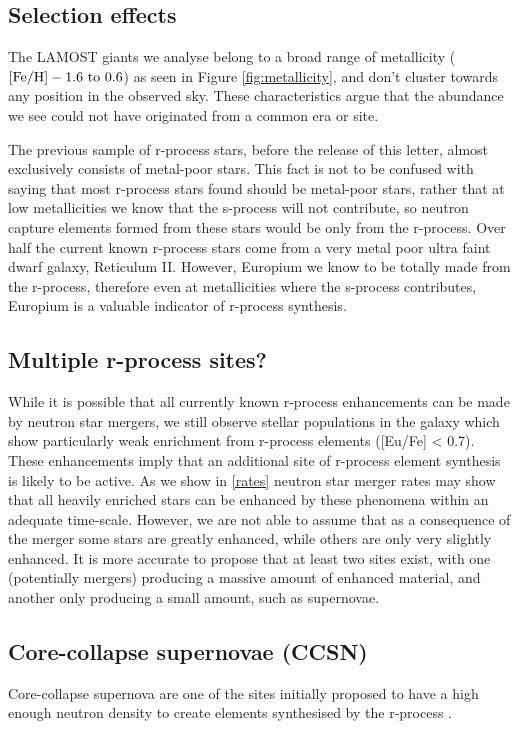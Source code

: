 \documentclass[a4paper,fleqn,usenatbib]{mnras}
\begin{document}
	\subsection{Selection effects}
	The LAMOST giants we analyse belong to a broad range of metallicity ($\rm{[Fe/H]} -1.6\ \rm{to}\ 0.6$) as seen in Figure \ref{fig:metallicity}, and don't cluster towards any position in the observed sky. These characteristics argue that the abundance we see could not have originated from a common era or site. 
	
	The previous sample of r-process stars, before the release of this letter, almost exclusively consists of metal-poor stars. This fact is not to be confused with saying that most r-process stars found should be metal-poor stars, rather that at low metallicities we know that the s-process will not contribute, so neutron capture elements formed from these stars would be only from the r-process. Over half the current known r-process stars come from a very metal poor ultra faint dwarf galaxy, Reticulum II. However, Europium we know to be totally made from the r-process, therefore even at metallicities where the s-process contributes, Europium is a valuable indicator of r-process synthesis.
	
	\subsection{Multiple r-process sites?}
	While it is possible that all currently known r-process enhancements can be made by neutron star mergers, we still observe stellar populations in the galaxy which show particularly weak enrichment from r-process elements ([Eu/Fe] < 0.7). These enhancements imply that an additional site of r-process element synthesis is likely to be active. As we show in \ref{rates}  neutron star merger rates may show that all heavily enriched stars can be enhanced by these phenomena within an adequate time-scale. However, we are not able to assume that as a consequence of the merger some stars are greatly enhanced, while others are only very slightly enhanced. It is more accurate to propose that at least two sites exist, with one (potentially mergers) producing a massive amount of enhanced material, and another only producing a small amount, such as supernovae. 
	
	\subsection{Core-collapse supernovae (CCSN)}
	Core-collapse supernova are one of the sites initially proposed to have a high enough neutron density to create elements synthesised by the r-process \citep{Burbidge1957}. 
	
\end{document}
